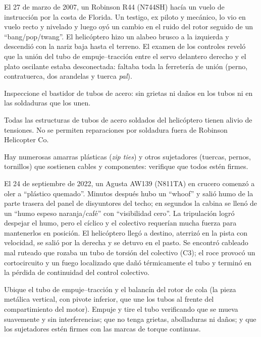 \begin{caso}
El 27 de marzo de 2007, un Robinson R44 (N744SH) hacía un vuelo de instrucción por la costa de Florida. Un testigo, ex piloto y mecánico, lo vio en vuelo recto y nivelado y luego oyó un cambio en el ruido del rotor seguido de un ``bang/pop/twang''. El helicóptero hizo un alabeo brusco a la izquierda y descendió con la nariz baja hasta el terreno. El examen de los controles reveló que la unión del tubo de empuje--tracción entre el servo delantero derecho y el plato oscilante estaba desconectada: faltaba toda la ferretería de unión (perno, contratuerca, dos arandelas y tuerca \emph{pal}).
\end{caso}

Inspeccione el bastidor de tubos de acero: sin grietas ni daños en los tubos ni en las soldaduras que los unen.

\begin{nota}
Todas las estructuras de tubos de acero soldados del helicóptero tienen alivio de tensiones. No se permiten reparaciones por soldadura fuera de Robinson Helicopter Co.
\end{nota}

Hay numerosas amarras plásticas (\emph{zip ties}) y otros sujetadores (tuercas, pernos, tornillos) que sostienen cables y componentes: verifique que todos estén firmes.

\begin{caso}
El 24 de septiembre de 2022, un Agusta AW139 (N811TA) en crucero comenzó a oler a ``plástico quemado''. Minutos después hubo un ``whoof'' y salió humo de la parte trasera del panel de disyuntores del techo; en segundos la cabina se llenó de un ``humo espeso naranja/café'' con ``visibilidad cero''. La tripulación logró despejar el humo, pero el cíclico y el colectivo requerían mucha fuerza para mantenerlos en posición. El helicóptero llegó a destino, aterrizó en la pista con velocidad, se salió por la derecha y se detuvo en el pasto. Se encontró cableado mal ruteado que rozaba un tubo de torsión del colectivo (C3); el roce provocó un cortocircuito y un fuego localizado que dañó térmicamente el tubo y terminó en la pérdida de continuidad del control colectivo.
\end{caso}

Ubique el tubo de empuje--tracción y el balancín del rotor de cola (la pieza metálica vertical, con pivote inferior, que une los tubos al frente del compartimiento del motor). Empuje y tire el tubo verificando que se mueva suavemente y sin interferencias; que no tenga grietas, abolladuras ni daños; y que los sujetadores estén firmes con las marcas de torque continuas.

